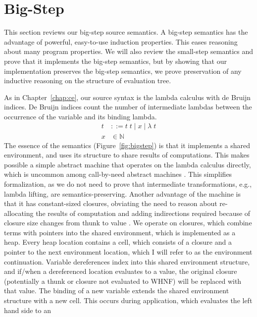 \section{Big-Step \ce} \label{sec:cem_big}

This section reviews our big-step source semantics. A big-step semantics
has the advantage of powerful, easy-to-use induction properties. This eases
reasoning about many program properties. We will also review the small-step
semantics and prove that it implements the big-step semantics, but by showing
that our implementation preserves the big-step semantics, we prove preservation
of any inductive reasoning on the structure of evaluation tree.  

As in Chapter~\ref{chap:ce}, our source syntax is the lambda calculus with de
Bruijn indices. De Bruijn indices count the number of intermediate lambdas
between the occurrence of the variable and its binding lambda.  
\begin{align*}
 t &::= t \; t \; | \; x \; | \;  \lambda \; t \\
 x &\in \mathbb{N}
\end{align*}
The essence of the \ce semantics (Figure~\ref{fig:bigstep}) is that it
implements a shared environment, and uses its structure to share results of
computations. This makes possible a simple abstract machine that operates on the
lambda calculus directly, which is uncommon among call-by-need abstract machines
\cite{jonesstg,launchburynatural,TIM,johnsson1984efficient}. This simplifies
formalization, as we do not need to prove that intermediate transformations,
e.g., lambda lifting, are semantics-preserving. Another advantage of the \ce
machine is that it has constant-sized closures, obviating the need to reason
about re-allocating the results of computation and adding indirections required
because of closure size changes from thunk to value \cite{jonesstg}. We operate
on closures, which combine terms with pointers into the shared environment,
which is implemented as a heap. Every heap location contains a cell, which
consists of a closure and a pointer to the next environment location, which I
will refer to as the environment continuation.  Variable dereferences index into
this shared environment structure, and if/when a dereferenced location evaluates
to a value, the original closure (potentially a thunk or closure not evaluated
to WHNF) will be replaced with that value. The binding of a new variable extends
the shared environment structure with a new
cell. This occurs during application, which evaluates the left hand side to an
